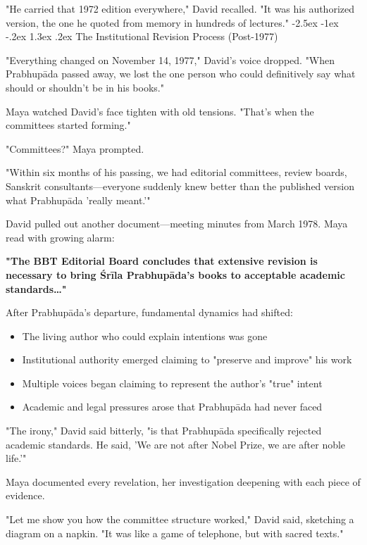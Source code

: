 \documentclass[12pt,twoside]{book}
\makeatletter
\renewcommand\section{\@startsection{section}{1}{\z@}%
{-2.5ex \@plus -1ex \@minus -.2ex}%
{1.3ex \@plus.2ex}%
{\normalfont\Large\bfseries}}
\makeatother
\begin{document}
"He carried that 1972 edition everywhere," David recalled. "It was his authorized version, the one he quoted from memory in hundreds of lectures."
\section{The Institutional Revision Process (Post-1977)}
\label{sec:orgb66615c}

"Everything changed on November 14, 1977," David's voice dropped. "When Prabhupāda passed away, we lost the one person who could definitively say what should or shouldn't be in his books."

Maya watched David's face tighten with old tensions. "That's when the committees started forming."

"Committees?" Maya prompted.

"Within six months of his passing, we had editorial committees, review boards, Sanskrit consultants—everyone suddenly knew better than the published version what Prabhupāda 'really meant.'"

David pulled out another document—meeting minutes from March 1978. Maya read with growing alarm:

\textbf{"The BBT Editorial Board concludes that extensive revision is necessary to bring Śrīla Prabhupāda's books to acceptable academic standards\ldots{}"}

After Prabhupāda's departure, fundamental dynamics had shifted:
\begin{itemize}
\item The living author who could explain intentions was gone
\item Institutional authority emerged claiming to "preserve and improve" his work
\item Multiple voices began claiming to represent the author's "true" intent
\item Academic and legal pressures arose that Prabhupāda had never faced
\end{itemize}

"The irony," David said bitterly, "is that Prabhupāda specifically rejected academic standards. He said, 'We are not after Nobel Prize, we are after noble life.'"

Maya documented every revelation, her investigation deepening with each piece of evidence.


"Let me show you how the committee structure worked," David said, sketching a diagram on a napkin. "It was like a game of telephone, but with sacred texts."
\end{document}
